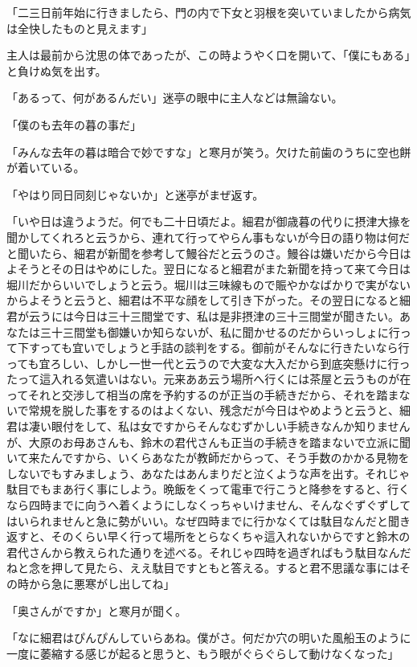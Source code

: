 \documentclass[12pt, openright]{book}
\begin{document}
「二三日前年始に行きましたら、門の内で下女と羽根を突いていましたから病気は全快したものと見えます」

主人は最前から沈思の体であったが、この時ようやく口を開いて、「僕にもある」と負けぬ気を出す。

「あるって、何があるんだい」迷亭の眼中に主人などは無論ない。

「僕のも去年の暮の事だ」

「みんな去年の暮は暗合で妙ですな」と寒月が笑う。欠けた前歯のうちに空也餅が着いている。

「やはり同日同刻じゃないか」と迷亭がまぜ返す。

「いや日は違うようだ。何でも二十日頃だよ。細君が御歳暮の代りに摂津大掾を聞かしてくれろと云うから、連れて行ってやらん事もないが今日の語り物は何だと聞いたら、細君が新聞を参考して鰻谷だと云うのさ。鰻谷は嫌いだから今日はよそうとその日はやめにした。翌日になると細君がまた新聞を持って来て今日は堀川だからいいでしょうと云う。堀川は三味線もので賑やかなばかりで実がないからよそうと云うと、細君は不平な顔をして引き下がった。その翌日になると細君が云うには今日は三十三間堂です、私は是非摂津の三十三間堂が聞きたい。あなたは三十三間堂も御嫌いか知らないが、私に聞かせるのだからいっしょに行って下すっても宜いでしょうと手詰の談判をする。御前がそんなに行きたいなら行っても宜ろしい、しかし一世一代と云うので大変な大入だから到底突懸けに行ったって這入れる気遣いはない。元来ああ云う場所へ行くには茶屋と云うものが在ってそれと交渉して相当の席を予約するのが正当の手続きだから、それを踏まないで常規を脱した事をするのはよくない、残念だが今日はやめようと云うと、細君は凄い眼付をして、私は女ですからそんなむずかしい手続きなんか知りませんが、大原のお母あさんも、鈴木の君代さんも正当の手続きを踏まないで立派に聞いて来たんですから、いくらあなたが教師だからって、そう手数のかかる見物をしないでもすみましょう、あなたはあんまりだと泣くような声を出す。それじゃ駄目でもまあ行く事にしよう。晩飯をくって電車で行こうと降参をすると、行くなら四時までに向うへ着くようにしなくっちゃいけません、そんなぐずぐずしてはいられませんと急に勢がいい。なぜ四時までに行かなくては駄目なんだと聞き返すと、そのくらい早く行って場所をとらなくちゃ這入れないからですと鈴木の君代さんから教えられた通りを述べる。それじゃ四時を過ぎればもう駄目なんだねと念を押して見たら、ええ駄目ですともと答える。すると君不思議な事にはその時から急に悪寒がし出してね」

「奥さんがですか」と寒月が聞く。

「なに細君はぴんぴんしていらあね。僕がさ。何だか穴の明いた風船玉のように一度に萎縮する感じが起ると思うと、もう眼がぐらぐらして動けなくなった」
\end{document}
